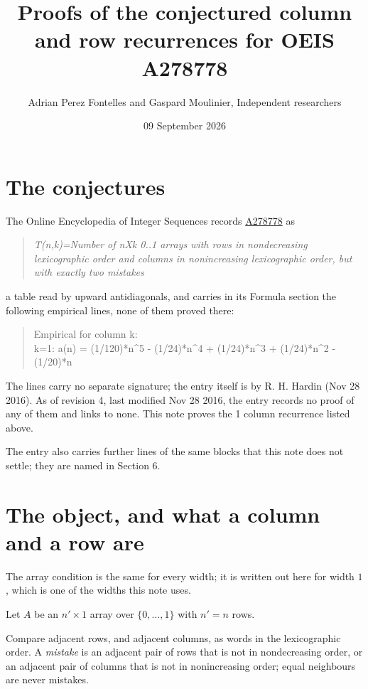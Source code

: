 \documentclass[11pt]{article}
\title{Proofs of the conjectured column and row recurrences for OEIS A278778}
\author{Adrian Perez Fontelles and Gaspard Moulinier, Independent researchers}
\date{09 September 2026}
\theoremstyle{definition}
\begin{document}
\maketitle
\section{The conjectures}

The Online Encyclopedia of Integer Sequences records \href{https://oeis.org/A278778}{A278778} as

\begin{quote}\itshape T(n,k)=Number of nXk 0..1 arrays with rows in nondecreasing lexicographic order and columns in nonincreasing lexicographic order, but with exactly two mistakes\end{quote}

a table read by upward antidiagonals, and carries in its Formula section the following empirical lines, none of them proved there:

\begin{quote}\ttfamily Empirical for column k:\\
k=1: a(n) = (1/120)*n\textasciicircum{}5 - (1/24)*n\textasciicircum{}4 + (1/24)*n\textasciicircum{}3 + (1/24)*n\textasciicircum{}2 - (1/20)*n\end{quote}

The lines carry no separate signature; the entry itself is by R. H. Hardin (Nov 28 2016). As of revision 4, last modified Nov 28 2016, the entry records no proof of any of them and links to none. This note proves the 1 column recurrence listed above.

The entry also carries further lines of the same blocks that this note does not settle; they are named in Section 6.

\section{The object, and what a column and a row are}

The array condition is the same for every width; it is written out here for width $1$, which is one of the widths this note uses.

Let $A$ be an $n' \times 1$ array over $\{0,\dots,1\}$ with $n' = n$ rows.

Compare adjacent rows, and adjacent columns, as words in the lexicographic order. A {\itshape mistake} is an adjacent pair of rows that is not in nondecreasing order, or an adjacent pair of columns that is not in nonincreasing order; equal neighbours are never mistakes.
\end{document}

